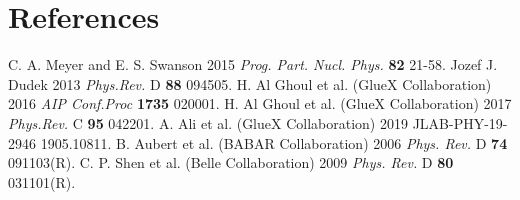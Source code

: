 \documentclass[a4paper]{jpconf}
\begin{document}
\section*{References}
\begin{thebibliography}{9}
 C. A. Meyer and E. S. Swanson 2015 {\it Prog. Part. Nucl. Phys.} {\bf 82} 21-58.
 Jozef J. Dudek 2013 {\it Phys.Rev.} D {\bf 88} 094505.
 H. Al Ghoul et al. (GlueX Collaboration) 2016 {\it AIP Conf.Proc} {\bf 1735} 020001.
 H. Al Ghoul et al. (GlueX Collaboration) 2017 {\it Phys.Rev.} C {\bf 95} 042201.
 A. Ali et al. (GlueX Collaboration) 2019 JLAB-PHY-19-2946 1905.10811.
 B. Aubert et al. (BABAR Collaboration) 2006 {\it Phys. Rev.} D {\bf 74} 091103(R).
 C. P. Shen et al. (Belle Collaboration) 2009 {\it Phys. Rev.} D {\bf 80} 031101(R).
\end{thebibliography}
\end{document}
